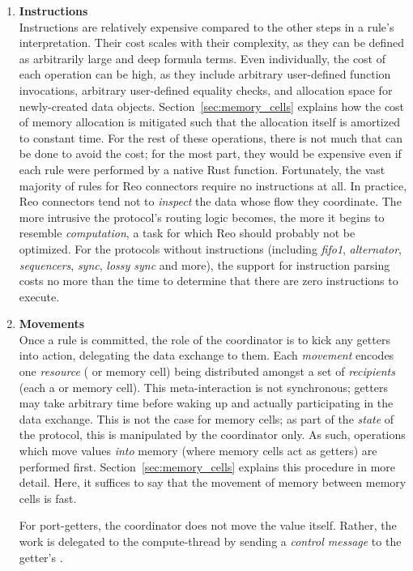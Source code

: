\begin{enumerate}
	
	\item \textbf{Instructions}\\
	Instructions are relatively expensive compared to the other steps in a rule's interpretation. Their cost scales with their complexity, as they can be defined as arbitrarily large and deep formula terms. Even individually, the cost of each operation can be high, as they include arbitrary user-defined function invocations, arbitrary user-defined equality checks, and allocation space for newly-created data objects. Section~\ref{sec:memory_cells} explains how the cost of memory allocation is mitigated such that the allocation itself is amortized to constant time. For the rest of these operations, there is not much that can be done to avoid the cost; for the most part, they would be expensive even if each rule were performed by a native Rust function. Fortunately, the vast majority of rules for Reo connectors require no instructions at all. In practice, Reo connectors tend not to \textit{inspect} the data whose flow they coordinate. The more intrusive the protocol's routing logic becomes, the more it begins to resemble \textit{computation}, a task for which Reo should probably not be optimized. For the protocols without instructions (including \textit{fifo1}, \textit{alternator}, \textit{sequencers}, \textit{sync}, \textit{lossy sync} and more), the support for instruction parsing costs no more than the time to determine that there are zero instructions to execute.
	 
	 \item \textbf{Movements}\\
	 Once a rule is committed, the role of the coordinator is to kick any getters into action, delegating the data exchange to them. Each \textit{movement} encodes one \textit{resource} ( or memory cell) being distributed amongst a set of \textit{recipients} (each a  or memory cell). This meta-interaction is not synchronous; getters may take arbitrary time before waking up and actually participating in the data exchange. This is not the case for memory cells; as part of the \textit{state} of the protocol, this is manipulated by the coordinator only. As such, operations which move values \textit{into} memory (where memory cells act as getters) are performed first. Section~\ref{sec:memory_cells} explains this procedure in more detail. Here, it suffices to say that the movement of memory between memory cells is fast.
	 
	 For port-getters, the coordinator does not move the value itself. Rather, the work is delegated to the compute-thread by sending a \textit{control message} to the getter's . 
	 

\end{enumerate}
